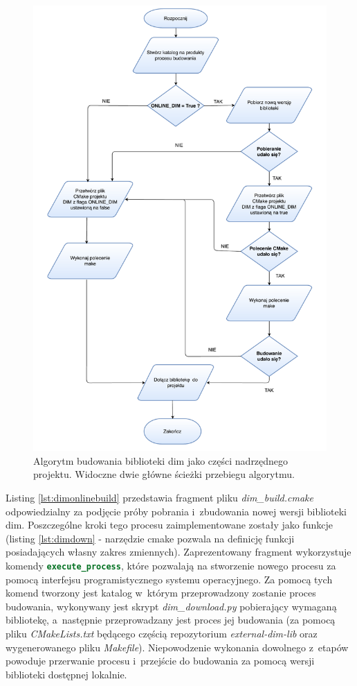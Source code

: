 \begin{figure}
\centering
\includegraphics[height=0.9\textheight]{res/DIMAlgo.pdf}
\caption{Algorytm budowania biblioteki \gls*{dim} jako części nadrzędnego projektu. Widoczne dwie główne ścieżki przebiegu algorytmu.}
\label{fig:dimalgo}
\end{figure}


Listing \ref{lst:dimonlinebuild} przedstawia fragment pliku \textit{dim\_build.cmake} odpowiedzialny za podjęcie próby pobrania i~zbudowania nowej wersji biblioteki \gls*{dim}. Poszczególne kroki tego procesu zaimplementowane zostały jako funkcje (listing \ref{lst:dimdown} - narzędzie \gls*{cmake} pozwala na definicję funkcji posiadających własny zakres zmiennych). Zaprezentowany fragment wykorzystuje komendy \lstinline[language=cmake]{execute_process}, które pozwalają na stworzenie nowego procesu za pomocą interfejsu programistycznego systemu operacyjnego. Za pomocą tych komend tworzony jest katalog w~którym przeprowadzony zostanie proces budowania, wykonywany jest skrypt \textit{dim\_download.py} pobierający wymaganą bibliotekę, a~następnie przeprowadzany jest proces jej budowania (za pomocą pliku \textit{CMakeLists.txt} będącego częścią repozytorium \textit{external-dim-lib} oraz wygenerowanego pliku \textit{Makefile}). Niepowodzenie wykonania dowolnego z~etapów powoduje przerwanie procesu i~przejście do budowania za pomocą wersji biblioteki dostępnej lokalnie.


